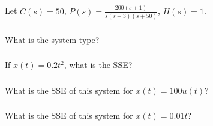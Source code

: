 \documentclass{article}	%
\begin{document}





\subsection{} Let $C(s) = 50$, $P(s) = \frac{200(s+1)}{s(s+3)(s+50)}$, $H(s)  = 1$.


\subsubsection{} What is the system type?

%

\subsubsection{}  If $x(t) = 0.2t^2$, what is  the SSE?



\subsubsection{} What is the SSE of this system for $x(t) = 100u(t)$?



\subsubsection{} What is the SSE of this system for $x(t) = 0.01t$?

%
\end{document}
